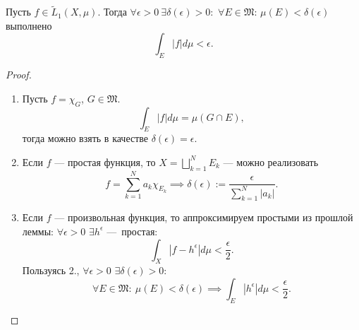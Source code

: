 \begin{theorem}
    Пусть $f \in \widetilde{L}_1(X, \mu)$.
    Тогда $\forall \epsilon > 0 \ \exists \delta(\epsilon) > 0:$ 
    $\forall E \in \mathfrak{M}$: $\mu(E) < \delta(\epsilon)$ 
    выполнено
    \[\int_E |f| d\mu < \epsilon.\]
\end{theorem} 
\begin{proof}\tab
    \begin{enumerate}
        \item Пусть $f = \chi_G$, $G \in \mathfrak{M}$.
        \[\int_E |f| d\mu = \mu(G \cap E),\]
        тогда можно взять в качестве $\delta(\epsilon) = \epsilon$.
        \item Если $f$ — простая функция, то $X = \bigsqcup\limits_{k=1}^{N}E_k$ — можно реализовать
        \[f = \sum\limits_{k=1}^{N}a_k \chi_{E_k}
        \implies
        \delta(\epsilon) := \frac{\epsilon}{\sum\limits_{k=1}^{N} |a_k|}.\]
        \item Если $f$ — произвольная функция, то аппроксимируем простыми из прошлой леммы:
        $\forall \epsilon > 0$ $\exists h^\epsilon$ — простая:
        \[\int_X |f - h^\epsilon| d\mu < \frac{\epsilon}{2}.\]
        Пользуясь 2., $\forall \epsilon > 0$ $\exists \delta(\epsilon) > 0:$
        \[\forall E \in \mathfrak{M}: \ \mu(E) < \delta(\epsilon)
        \implies
        \int_E |h^\epsilon| d\mu < \frac{\epsilon}{2}.\]
    \end{enumerate}
\end{proof} 

